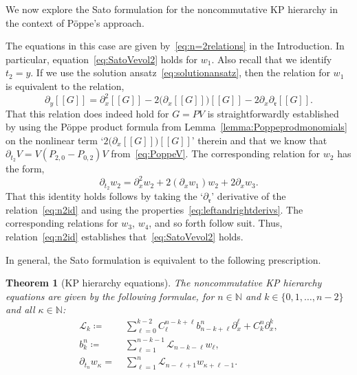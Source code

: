 \documentclass[5p,twocolumn]{elsarticle}
\newcommand*{\pa}{{\partial}}
\newcommand*{\lb}{[\![}
\newcommand*{\rb}{]\!]}
\newcommand*{\rl}{\mathfrak r}
\newtheorem{theorem}{Theorem}
\begin{document}
We now explore the Sato formulation for the noncommutative KP hierarchy in the context of P\"oppe's approach. 
%
\begin{example}[Case $n=2$]\label{ex:n=2}
  The equations in this case are given by~\eqref{eq:n=2relations} in the Introduction.
  In particular, equation~\eqref{eq:SatoVevol2} holds for $w_1$. 
  Also recall that we identify $t_2=y$.
  If we use the solution ansatz~\eqref{eq:solutionansatz}, then the relation
  for $w_1$ is equivalent to the relation, 
  \begin{equation}\label{eq:n2id}
    \pa_y\lb G\rb=\pa_x^2\lb G\rb-2\bigl(\pa_x\lb G\rb\bigr)\lb G\rb-2\pa_x\pa_{\rl}\lb G\rb.
  \end{equation}
  That this relation does indeed hold for $G=PV$ is straightforwardly established by using the P\"oppe product formula from Lemma~\ref{lemma:Poppeprodmonomials}
  on the nonlinear term `$2\bigl(\pa_x\lb G\rb\bigr)\lb G\rb$' therein and that we know that $\pa_{t_2}V=V(P_{2,0}-P_{0,2})V$ from~\eqref{eq:PoppeV}.
  The corresponding relation for $w_2$ has the form,
  \begin{equation*}
    \pa_{t_2}w_2=\pa_x^2w_2+2(\pa_xw_1)w_2+2\pa_xw_3.
  \end{equation*}
  That this identity holds follows by taking the `$\pa_{\rl}$' derivative of the relation~\eqref{eq:n2id} and using the properties~\eqref{eq:leftandrightderivs}.
  The corresponding relations for $w_3$, $w_4$, and so forth follow suit. Thus, relation~\eqref{eq:n2id} establishes that~\eqref{eq:SatoVevol2} holds.
\end{example}
%
In general, the Sato formulation is equivalent to the following prescription.
%
\begin{theorem}[KP hierarchy equations]\label{thm:hierarchyequations}
  The noncommutative KP hierarchy equations are given by the following formulae, for $n\in\mathbb N$ and $k\in\{0,1,\ldots,n-2\}$ and all $\kappa\in\mathbb N$:
  \begin{subequations}\label{eq:ncKPhierarchy}
  \begin{align}
    \mathcal L_k\coloneqq&\;\sum_{\ell=0}^{k-2}C_{\ell}^{n-k+\ell}b_{n-k+\ell}^n\pa_x^\ell+C_{k}^n\pa_x^k,\label{eq:ncKPhierarchyL}\\
    b_k^n\coloneqq&\;\sum_{\ell=1}^{n-k-1}\mathcal L_{n-k-\ell}w_\ell,\label{eq:ncKPhierarchybnk}\\
    \pa_{t_n}w_\kappa=&\;\sum_{\ell=1}^n\mathcal L_{n-\ell+1}w_{\kappa+\ell-1}.\label{eq:ncKPhierarchyw1}
  \end{align}
  \end{subequations}
\end{theorem}
\end{document}
